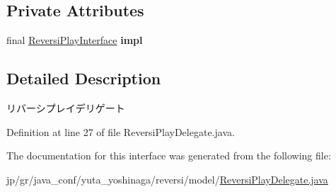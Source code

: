 \subsection*{Private Attributes}
\begin{DoxyCompactItemize}
\item 
\mbox{\label{classjp_1_1gr_1_1java__conf_1_1yuta__yoshinaga_1_1reversi_1_1model_1_1_reversi_play_delegate_a71b45ac9f49c47508ffef48c9e212d16}} 
final \mbox{\hyperlink{interfacejp_1_1gr_1_1java__conf_1_1yuta__yoshinaga_1_1reversi_1_1model_1_1_reversi_play_interface}{Reversi\+Play\+Interface}} {\bfseries impl}
\end{DoxyCompactItemize}


\subsection{Detailed Description}
リバーシプレイデリゲート 

Definition at line 27 of file Reversi\+Play\+Delegate.\+java.



The documentation for this interface was generated from the following file\+:\begin{DoxyCompactItemize}
\item 
jp/gr/java\+\_\+conf/yuta\+\_\+yoshinaga/reversi/model/\mbox{\hyperlink{_reversi_play_delegate_8java}{Reversi\+Play\+Delegate.\+java}}\end{DoxyCompactItemize}
